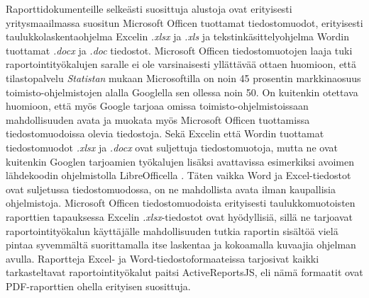 Raporttidokumenteille selkeästi suosittuja alustoja ovat erityisesti yritysmaailmassa suositun Microsoft Officen tuottamat tiedostomuodot, erityisesti taulukkolaskentaohjelma Excelin \textit{.xlsx} ja \textit{.xls} ja tekstinkäsittelyohjelma Wordin tuottamat \textit{.docx} ja \textit{.doc} tiedostot. Microsoft Officen tiedostomuotojen laaja tuki raportointityökalujen saralle ei ole varsinaisesti yllättävää ottaen huomioon, että tilastopalvelu \textit{Statistan} mukaan Microsoftilla on noin 45 prosentin markkinaosuus toimisto-ohjelmistojen alalla Googlella sen ollessa noin 50. \cite{office} On kuitenkin otettava huomioon, että myös Google tarjoaa omissa toimisto-ohjelmistoissaan mahdollisuuden avata ja muokata myös Microsoft Officen tuottamissa tiedostomuodoissa olevia tiedostoja. Sekä Excelin että Wordin tuottamat tiedostomuodot \textit{.xlsx} ja \textit{.docx} ovat suljettuja tiedostomuotoja, mutta ne ovat kuitenkin Googlen tarjoamien työkalujen lisäksi avattavissa esimerkiksi avoimen lähdekoodin ohjelmistolla LibreOfficella \cite{libreoffice}. Täten vaikka Word ja Excel-tiedostot ovat suljetussa tiedostomuodossa, on ne mahdollista avata ilman kaupallisia ohjelmistoja. Microsoft Officen tiedostomuodoista erityisesti taulukkomuotoisten raporttien tapauksessa Excelin \textit{.xlsx}-tiedostot ovat hyödyllisiä, sillä ne tarjoavat raportointityökalun käyttäjälle mahdollisuuden tutkia raportin sisältöä vielä pintaa syvemmältä suorittamalla itse laskentaa ja kokoamalla kuvaajia ohjelman avulla. Raportteja Excel- ja Word-tiedostoformaateissa tarjosivat kaikki tarkasteltavat raportointityökalut paitsi ActiveReportsJS, eli nämä formaatit ovat PDF-raporttien ohella erityisen suosittuja.

